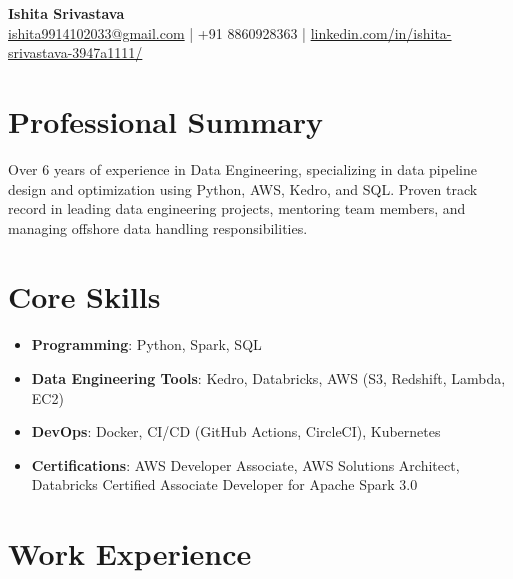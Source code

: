 \documentclass[a4paper,10pt]{article}
\begin{document}
\begin{center}
    {\LARGE \textbf{Ishita Srivastava}} \\
    \vspace{2pt}
    \href{mailto:ishita9914102033@gmail.com}{ishita9914102033@gmail.com} \hspace{12pt} | \hspace{12pt} +91 8860928363 \hspace{12pt} | \hspace{12pt} \href{https://linkedin.com/in/ishita-srivastava-3947a1111/}{linkedin.com/in/ishita-srivastava-3947a1111/} \\
\end{center}
\vspace{-8pt}

\section*{Professional Summary}
Over 6 years of experience in Data Engineering, specializing in data pipeline design and optimization using Python, AWS, Kedro, and SQL. Proven track record in leading data engineering projects, mentoring team members, and managing offshore data handling responsibilities.

\section*{Core Skills}
\begin{itemize}
    \item \textbf{Programming}: Python, Spark, SQL
    \item \textbf{Data Engineering Tools}: Kedro, Databricks, AWS (S3, Redshift, Lambda, EC2)
    \item \textbf{DevOps}: Docker, CI/CD (GitHub Actions, CircleCI), Kubernetes
    \item \textbf{Certifications}: AWS Developer Associate, AWS Solutions Architect, Databricks Certified Associate Developer for Apache Spark 3.0
\end{itemize}


\section*{Work Experience}
\end{document}
